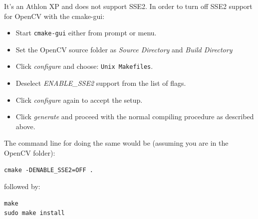 It's an  Athlon XP and does not support SSE2. In order to turn off SSE2 support for OpenCV with the cmake-gui:
\begin{itemize}
\item Start \texttt{cmake-gui} either from prompt or menu.
\item Set the OpenCV source folder as \textit{Source Directory} and \textit{Build Directory}
\item Click \textit{configure} and choose: \texttt{Unix Makefiles}.
\item Deselect \textit{ENABLE\_SSE2} support from the list of flags.
\item Click \textit{configure} again to accept the setup.
\item Click \textit{generate} and proceed with the normal compiling procedure as described above.
\end{itemize}

The command line for doing the same would be (assuming you are in the OpenCV folder):

\begin{lstlisting}
cmake -DENABLE_SSE2=OFF .
\end{lstlisting}
followed by:
\begin{lstlisting}
make
sudo make install
\end{lstlisting}


